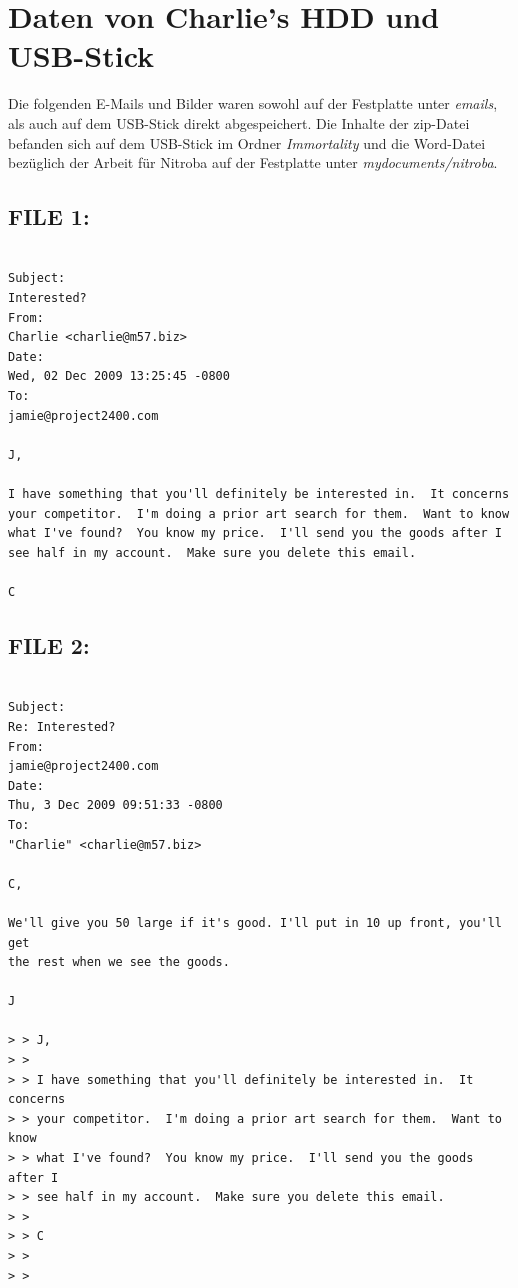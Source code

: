 \section{Daten von Charlie's HDD und USB-Stick}
\label{sec:charlie_daten}

Die folgenden E-Mails und Bilder waren sowohl auf der Festplatte unter \textit{emails}, als auch auf dem USB-Stick direkt abgespeichert. Die Inhalte der zip-Datei befanden sich auf dem USB-Stick im Ordner \textit{Immortality} und die Word-Datei bezüglich der Arbeit für Nitroba auf der Festplatte unter \textit{mydocuments/nitroba}.

\subsection{FILE 1:}
\label{sec:charlie_daten_1}

\begin{lstlisting}

Subject:
Interested?
From:
Charlie <charlie@m57.biz>
Date:
Wed, 02 Dec 2009 13:25:45 -0800
To:
jamie@project2400.com

J,

I have something that you'll definitely be interested in.  It concerns your competitor.  I'm doing a prior art search for them.  Want to know what I've found?  You know my price.  I'll send you the goods after I see half in my account.  Make sure you delete this email.

C

\end{lstlisting}

\subsection{FILE 2:}
\label{sec:charlie_daten_2}

\begin{lstlisting}

Subject:
Re: Interested?
From:
jamie@project2400.com
Date:
Thu, 3 Dec 2009 09:51:33 -0800
To:
"Charlie" <charlie@m57.biz>

C,

We'll give you 50 large if it's good. I'll put in 10 up front, you'll get
the rest when we see the goods.

J

> > J,
> >
> > I have something that you'll definitely be interested in.  It concerns
> > your competitor.  I'm doing a prior art search for them.  Want to know
> > what I've found?  You know my price.  I'll send you the goods after I
> > see half in my account.  Make sure you delete this email.
> >
> > C
> >
> >

\end{lstlisting}


